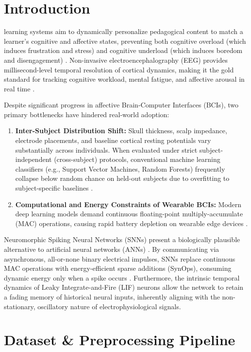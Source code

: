 \documentclass[journal]{IEEEtran}
\begin{document}
\section{Introduction}
 learning systems aim to dynamically personalize pedagogical content to match a learner's cognitive and affective states, preventing both cognitive overload (which induces frustration and stress) and cognitive underload (which induces boredom and disengagement) \cite{sweller1988}. Non-invasive electroencephalography (EEG) provides millisecond-level temporal resolution of cortical dynamics, making it the gold standard for tracking cognitive workload, mental fatigue, and affective arousal in real time \cite{lotte2018}.

Despite significant progress in affective Brain-Computer Interfaces (BCIs), two primary bottlenecks have hindered real-world adoption:
\begin{enumerate}
    \item \textbf{Inter-Subject Distribution Shift:} Skull thickness, scalp impedance, electrode placements, and baseline cortical resting potentials vary substantially across individuals. When evaluated under strict subject-independent (cross-subject) protocols, conventional machine learning classifiers (e.g., Support Vector Machines, Random Forests) frequently collapse below random chance on held-out subjects due to overfitting to subject-specific baselines \cite{lan2021, rayatdoost2022}.
    \item \textbf{Computational and Energy Constraints of Wearable BCIs:} Modern deep learning models demand continuous floating-point multiply-accumulate (MAC) operations, causing rapid battery depletion on wearable edge devices \cite{sze2017}.
\end{enumerate}

Neuromorphic Spiking Neural Networks (SNNs) present a biologically plausible alternative to artificial neural networks (ANNs) \cite{maass1997}. By communicating via asynchronous, all-or-none binary electrical impulses, SNNs replace continuous MAC operations with energy-efficient sparse additions (SynOps), consuming dynamic energy only when a spike occurs \cite{davies2018, roy2019}. Furthermore, the intrinsic temporal dynamics of Leaky Integrate-and-Fire (LIF) neurons allow the network to retain a fading memory of historical neural inputs, inherently aligning with the non-stationary, oscillatory nature of electrophysiological signals.

\section{Dataset \& Preprocessing Pipeline}
\end{document}
